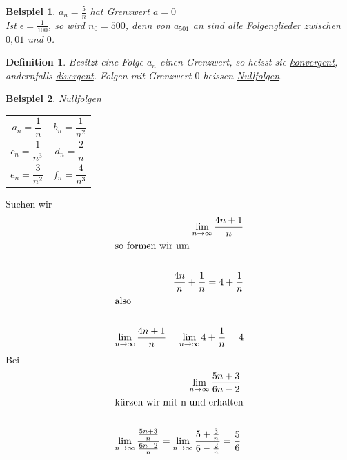 \documentclass[a4paper,10pt]{report}
\newtheorem{mydef}{Definition}
\newtheorem{myexample}{Beispiel}
\begin{document}
\begin{myexample}$a_n = \frac{5}{n}$ hat Grenzwert $a=0$\\
Ist $\epsilon = \frac{1}{100}$, so wird $n_0 = 500$, denn von $a_{501}$ an sind alle Folgenglieder zwischen $0,01$ und $0$.\end{myexample}
\begin{mydef}Besitzt eine Folge $a_n$ einen Grenzwert, so heisst sie \underline{konvergent}, andernfalls \underline{divergent}. Folgen mit Grenzwert $0$ heissen \underline{Nullfolgen}.\end{mydef}
\begin{myexample}Nullfolgen\\
	\begin{tabularx}{\textwidth}{XX}
		\begin{equation*}a_n = \frac{1}{n}\end{equation*}&\begin{equation*}b_n = \frac{1}{n^2}\end{equation*}\\
		\begin{equation*}c_n = \frac{1}{n^3}\end{equation*}&\begin{equation*}d_n = \frac{2}{n}\end{equation*}\\
		\begin{equation*}e_n = \frac{3}{n^2}\end{equation*}&\begin{equation*}f_n = \frac{4}{n^3}\end{equation*}
	\end{tabularx}
\end{myexample}
\noindent
Suchen wir
\begin{eqnarray*} 
	\lim_{n \to \infty} \frac{4n+1}{n}\\	
	\shortintertext{so formen wir um}\\
	\frac{4n}{n}+ \frac{1}{n} = 4 + \frac{1}{n}\\
	\shortintertext{also}\\
	\lim_{n \to \infty} \frac{4n +1}{n} = \lim_{n \to \infty}4+\frac{1}{n} = 4
\end{eqnarray*}
Bei
\begin{eqnarray*}
	\lim_{n \to \infty}\frac{5n+3}{6n-2}\\
	\shortintertext{kürzen wir mit n und erhalten}\\
	\lim_{n \to \infty}\frac{\frac{5n+3}{n}}{\frac{6n-2}{n}} = \lim_{n \to \infty}\frac{5+\frac{3}{n}}{6 -\frac{2}{n}} = \frac{5}{6}
\end{eqnarray*}
\end{document}
